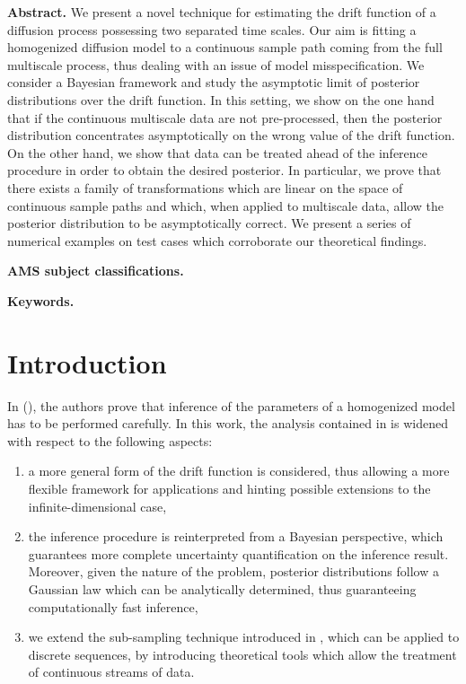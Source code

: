 \documentclass[10pt]{article}
\begin{document}
\maketitle	

\textbf{Abstract.}  We present a novel technique for estimating the drift function of a diffusion process possessing two separated time scales. Our aim is fitting a homogenized diffusion model to a continuous sample path coming from the full multiscale process, thus dealing with an issue of model misspecification. We consider a Bayesian framework and study the asymptotic limit of posterior distributions over the drift function. In this setting, we show on the one hand that if the continuous multiscale data are not pre-processed, then the posterior distribution concentrates asymptotically on the wrong value of the drift function. On the other hand, we show that data can be treated ahead of the inference procedure in order to obtain the desired posterior. In particular, we prove that there exists a family of transformations which are linear on the space of continuous sample paths and which, when applied to multiscale data, allow the posterior distribution to be asymptotically correct. We present a series of numerical examples on test cases which corroborate our theoretical findings.

\textbf{AMS subject classifications.} 

\textbf{Keywords.} 

\section{Introduction}

In \cite{PaS07} (), the authors prove that inference of the parameters of a homogenized model has to be performed carefully. In this work, the analysis contained in \cite{PaS07} is widened with respect to the following aspects:
\begin{enumerate}[label=\arabic*)]
	\item a more general form of the drift function is considered, thus allowing a more flexible framework for applications and hinting possible extensions to the infinite-dimensional case,
	\item the inference procedure is reinterpreted from a Bayesian perspective, which guarantees more complete uncertainty quantification on the inference result. Moreover, given the nature of the problem, posterior distributions follow a Gaussian law which can be analytically determined, thus guaranteeing computationally fast inference,
	\item we extend the sub-sampling technique introduced in \cite{PaS07}, which can be applied to discrete sequences, by introducing theoretical tools which allow the treatment of continuous streams of data.
\end{enumerate}
\end{document}
